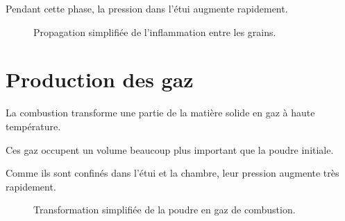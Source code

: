 Pendant cette phase, la pression dans l'étui augmente rapidement.

\begin{figure}[htbp]
\centering


\caption{Propagation simplifiée de l'inflammation entre les grains.}
\label{fig:propagation_combustion}

\end{figure}

\section{Production des gaz}

La combustion transforme une partie de la matière solide en gaz à haute
température.

Ces gaz occupent un volume beaucoup plus important que la poudre initiale.

Comme ils sont confinés dans l'étui et la chambre, leur pression augmente très
rapidement.

\begin{figure}[htbp]
\centering


\caption{Transformation simplifiée de la poudre en gaz de combustion.}
\label{fig:production_gaz}

\end{figure}

